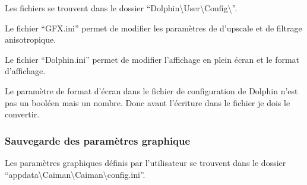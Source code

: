 \documentclass[a4paper,12pt,french]{sphinxmanual}
\begin{document}
\sphinxAtStartPar
Les fichiers se trouvent dans le dossier “Dolphin\textbackslash{}User\textbackslash{}Config\textbackslash{}”.

\sphinxAtStartPar
Le fichier “GFX.ini” permet de modifier les paramètres de d’upscale et de filtrage anisotropique.

\sphinxAtStartPar
Le fichier “Dolphin.ini” permet de modifier l’affichage en plein écran et le format d’affichage.

\sphinxAtStartPar
Le paramètre de format d’écran dans le fichier de configuration de Dolphin n’est pas un booléen mais un nombre. Donc avant l’écriture dans le fichier je dois le convertir.

\begin{sphinxVerbatim}[commandchars=\\\{\}]
   
             
             
             

             
                 
                 
            
\end{sphinxVerbatim}


\subsubsection{Sauvegarde des paramètres graphique}
\label{\detokenize{organique:sauvegarde-des-parametres-graphique}}
\sphinxAtStartPar
Les paramètres graphiques définis par l’utilisateur se trouvent dans le dossier “appdata\textbackslash{}Caiman\textbackslash{}Caiman\textbackslash{}config.ini”.
\end{document}
